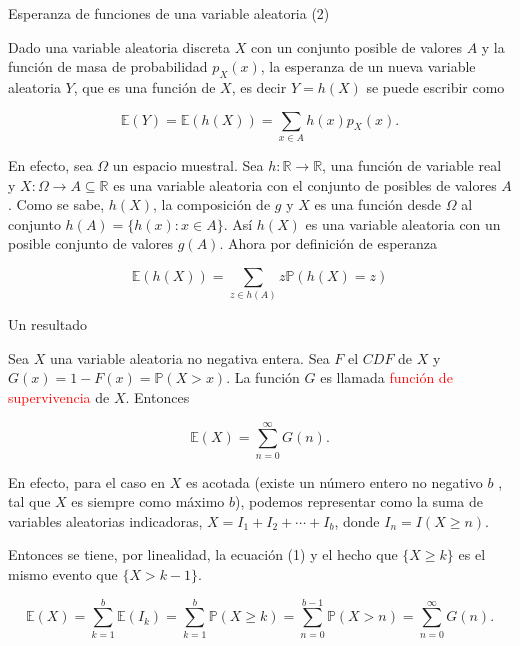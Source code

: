 \documentclass[10pt]{beamer}
\begin{document}
\begin{frame}{Esperanza de funciones de una variable aleatoria (2)}
\small{Dado una variable aleatoria discreta $X$ con un conjunto posible de valores $A$ y la funci\'on de masa de probabilidad $p_X(x)$, la esperanza de un nueva variable aleatoria $Y$, que es una funci\'on de $X$, es decir  $Y = h(X)$ se puede escribir como
	

\begin{equation*}
\mathbb{E}(Y) = \mathbb{E}(h(X)) = \sum_{x \in A}h(x)p_X(x).
\end{equation*}
	
	\vspace{0.2cm}
	
En efecto, sea $\Omega$ un espacio muestral. Sea $h :\mathbb{R} \rightarrow \mathbb{R}$, una funci\'on de variable real y $X: \Omega \rightarrow A \subseteq \mathbb{R}$ es una variable aleatoria con el conjunto de posibles de valores $A$. Como se sabe, $h(X)$, la composici\'on de $g$ y $X$ es una funci\'on desde $\Omega$ al conjunto $h(A) = \{h(x): x\in A\}$. As\'i $h(X)$ es una variable aleatoria con un posible conjunto de valores $g(A)$. Ahora por definici\'on de esperanza
	
	\vspace{0.2cm}

\[
\mathbb{E}(h(X)) = \sum_{z \in h(A)}z\mathbb{P}(h(X) = z)
	\]
	
}

\end{frame}

\begin{frame}{Un resultado}
\small{ Sea $X$ una variable aleatoria no negativa entera. Sea $F$ el $CDF$ de $X$ y $G(x) = 1 -F(x) = \mathbb{P}(X > x)$. La funci\'on $G$ es llamada \textcolor{red}{funci\'on de supervivencia} de $X$. Entonces
	
\[
\mathbb{E}(X) = \sum_{n = 0}^{\infty}G(n).
\]	

En efecto, para el caso en $X$ es acotada (existe un n\'umero entero no negativo $b$ , tal que $X$ es siempre como m\'aximo $b$), podemos representar como la suma de variables aleatorias indicadoras, $X = I_1 + I_2 + \cdots + I_b$, donde  $I_n = I(X \geq n)$.


Entonces se tiene, por linealidad, la ecuaci\'on (1) y el hecho que $\{ X \geq k\}$ es el mismo evento que $\{ X > k-1\}$.

\[
\mathbb{E}(X) = \sum_{k =1}^{b}\mathbb{E}(I_k) = \sum_{k =1}^{b}\mathbb{P}(X \geq k) = \sum_{n = 0}^{b -1}\mathbb{P}(X > n) = \sum_{n = 0}^{\infty}G(n).
\]
}
\end{frame}
\end{document}
